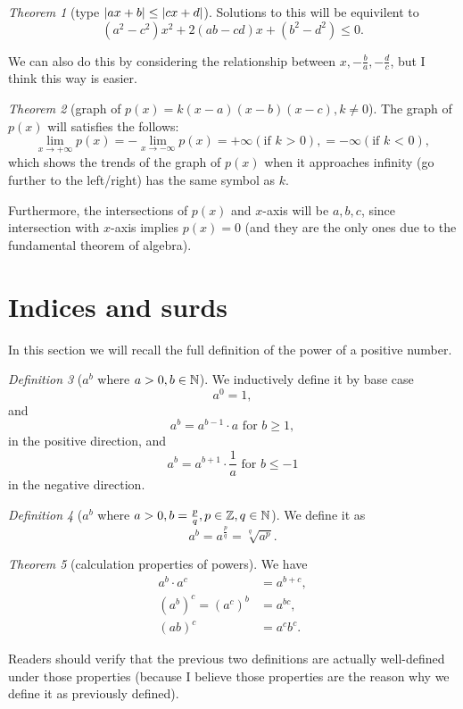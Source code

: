 \documentclass[8pt]{article}
\theoremstyle{remark}
\newtheorem{theorem}{Theorem}[section]
\newtheorem{definition}[theorem]{Definition}
\begin{document}
        \begin{theorem}[type $\left\lvert ax + b \right\rvert \leq \left\lvert cx + d \right\rvert$]
            Solutions to this will be equivilent to
            $$
            (a^2 - c^2) x^2 + 2(ab - cd)x + (b^2 - d^2) \leq 0.
            $$

            We can also do this by considering the relationship between $x, -\frac{b}{a}, -\frac{d}{c}$, but I think this way is easier.
        \end{theorem}

        \begin{theorem}[graph of $p(x) = k (x-a) (x-b) (x-c), k \neq 0$]
            The graph of $p(x)$ will satisfies the follows:
            $$
                \lim_{x \rightarrow +\infty} p(x) = - \lim_{x \rightarrow -\infty} p(x) = +\infty (\text{if $k$ > 0}), = -\infty (\text{if $k$ < 0}),
            $$
            which shows the trends of the graph of $p(x)$ when it approaches infinity (go further to the left/right) has the same symbol as $k$.

            Furthermore, the intersections of $p(x)$ and $x$-axis will be $ a, b, c$, since intersection with $x$-axis implies $p(x) = 0$ (and they are the only ones due to the fundamental theorem of algebra).
        \end{theorem}

    \section{Indices and surds}
        In this section we will recall the full definition of the power of a positive number.

        \begin{definition}[$a^b$ where $a > 0, b \in \mathbb{N}$]
            We inductively define it by base case
            $$a^0 = 1,$$
            and $$a^b = a^{b - 1} \cdot a\text{ for } b \geq 1,$$
            in the positive direction, and
            $$a^b = a^{b + 1} \cdot \frac{1}{a}\text{ for } b \leq -1$$
            in the negative direction.
        \end{definition}

        \begin{definition}[$a^b$ where $a > 0, b = \frac{p}{q}, p \in \mathbb{Z}, q \in \mathbb{N}$]
            We define it as
            $$
                a^{b} = a^{\frac{p}{q}} = \sqrt[q]{a^p}.
            $$
        \end{definition}

        \begin{theorem}[calculation properties of powers]
            We have
            \begin{align*}
                a^b \cdot a^c &= a^{b + c},\\
                (a^b)^c = (a^c)^b &= a^{bc},\\
                (ab)^c &= a^c b^c.
            \end{align*}

            Readers should verify that the previous two definitions are actually well-defined under those properties (because I believe those properties are the reason why we define it as previously defined).
        \end{theorem}
\end{document}
